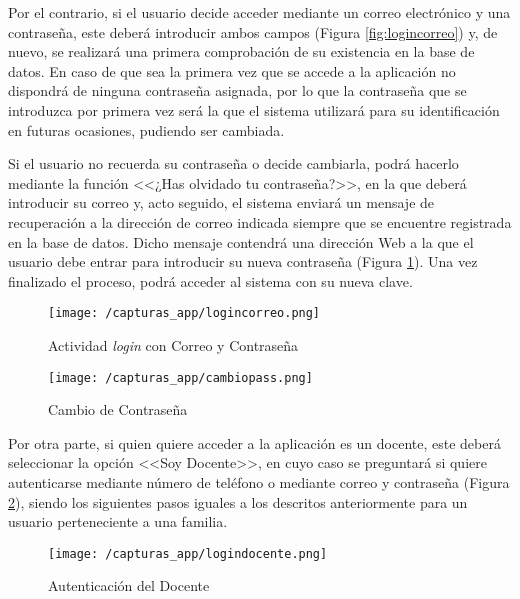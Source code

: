 Por el contrario, si el usuario decide acceder mediante un correo electrónico y una contraseña, este deberá introducir ambos campos (Figura \ref{fig:logincorreo}) y, de nuevo, se realizará una primera comprobación de su existencia en la base de datos. En caso de que sea la primera vez que se accede a la aplicación no dispondrá de ninguna contraseña asignada, por lo que la contraseña que se introduzca por primera vez será la que el sistema utilizará para su identificación en futuras ocasiones, pudiendo ser cambiada.

\clearpage

Si el usuario no recuerda su contraseña o decide cambiarla, podrá hacerlo mediante la función <<¿Has olvidado tu contraseña?>>, en la que deberá introducir su correo y, acto seguido, el sistema enviará un mensaje de recuperación a la dirección de correo indicada siempre que se encuentre registrada en la base de datos. Dicho mensaje contendrá una dirección Web a la que el usuario debe entrar para introducir su nueva contraseña (Figura \ref{fig:cambiopass}). Una vez finalizado el proceso, podrá acceder al sistema con su nueva clave.

\begin{figure}[!h]
	\centering
	\begin{minipage}{.5\textwidth}
		\centering
		\texttt{[image: /capturas\_app/logincorreo.png]}
		\caption{Actividad \textit{login} con Correo y Contraseña}
		\label{fig:logincorreo}
	\end{minipage}%
	\begin{minipage}{.5\textwidth}
		\centering
		\texttt{[image: /capturas\_app/cambiopass.png]}
		\caption{Cambio de Contraseña}
		\label{fig:cambiopass}
	\end{minipage}
\end{figure}

\clearpage

Por otra parte, si quien quiere acceder a la aplicación es un docente, este deberá seleccionar la opción <<Soy Docente>>, en cuyo caso se preguntará si quiere autenticarse mediante número de teléfono o mediante correo y contraseña (Figura \ref{fig:logindocente}), siendo los siguientes pasos iguales a los descritos anteriormente para un usuario perteneciente a una familia.

\begin{figure}[!h]
	\begin{center}
		\texttt{[image: /capturas\_app/logindocente.png]}
		\caption{Autenticación del Docente}
		\label{fig:logindocente}
	\end{center}
\end{figure}

